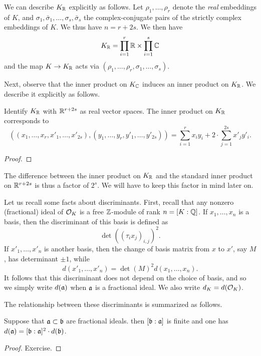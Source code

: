 We can describe $K_{\mathbb{R}}$ explicitly as follows.
Let $\rho_{1},\ldots,\rho_{r}$ denote the \emph{real} embeddings of $K$, and $\sigma_{1},\bar\sigma_{1},\ldots,\sigma_{s},\bar\sigma_{s}$ the complex-conjugate pairs of the strictly complex embeddings of $K$.
We thus have $n = r + 2s$.
We then have
\[ K_{\mathbb{R}} = \prod_{i = 1}^{r} \mathbb{R} \times \prod_{i = 1}^{s} \mathbb{C} \]
and the map $K \to K_{\mathbb{R}}$ acts via $(\rho_{1},\ldots,\rho_{r},\sigma_{1},\ldots,\sigma_{s})$.

Next, observe that the inner product on $K_{\mathbb{C}}$ induces an inner product on $K_{\mathbb{R}}$.
We describe it explicitly as follows.
\begin{lemma}
  Identify $K_{\mathbb{R}}$ with $\mathbb{R}^{r + 2s}$ as real vector spaces.
  The inner product on $K_{\mathbb{R}}$ corresponds to
  \[ ((x_{1},\ldots,x_{r},x'_{1},\ldots,x'_{2s}),(y_{1},\ldots,y_{r},y'_{1},\ldots,y'_{2s})) = \sum_{i = 1}^{r} x_{i} y_{i} + 2 \cdot \sum_{j = 1}^{2s} x'_{j} y'_{i}. \]
\end{lemma}
\begin{proof}
\end{proof}

The difference between the inner product on $K_{\mathbb{R}}$ and the standard inner product on $\mathbb{R}^{r + 2s}$ is thus a factor of $2^{s}$.
We will have to keep this factor in mind later on.

Let us recall some facts about discriminants.
First, recall that any nonzero (fractional) ideal of $\mathcal{O}_{K}$ is a free $\mathbb{Z}$-module of rank $n = [K:\mathbb{Q}]$.
If $x_{1},\ldots,x_{n}$ is a basis, then the discriminant of this basis is defined as
\[ \det((\tau_{i}x_{j})_{i,j})^{2}. \]
If $x'_{1},\ldots,x'_{n}$ is another basis, then the change of basis matrix from $x$ to $x'$, say $M$, has determinant $\pm 1$, while
\[ d(x'_{1},\ldots,x'_{n}) = \det(M)^{2} d(x_{1},\ldots,x_{n}). \]
It follows that this discriminant does not depend on the choice of basis, and so we simply write $d(\mathfrak{a})$ when $\mathfrak{a}$ is a fractional ideal.
We also write $d_{K} = d(\mathcal{O}_{K})$.

The relationship between these discriminants is summarized as follows.
\begin{lemma}
  Suppose that $\mathfrak{a} \subset \mathfrak{b}$ are fractional ideals.
  then $[\mathfrak{b}:\mathfrak{a}]$ is finite and one has $d(\mathfrak{a}) = [\mathfrak{b} : \mathfrak{a}]^{2} \cdot d(\mathfrak{b})$.
\end{lemma}
\begin{proof}
  Exercise.
\end{proof}

